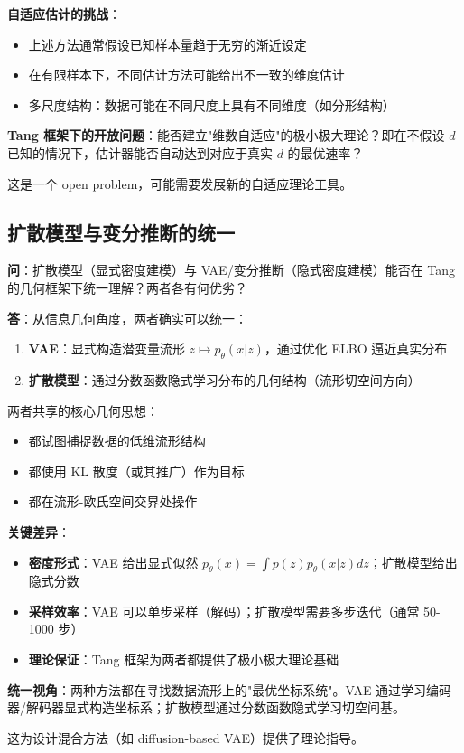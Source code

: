 \textbf{自适应估计的挑战}：
\begin{itemize}
    \item 上述方法通常假设已知样本量趋于无穷的渐近设定
    \item 在有限样本下，不同估计方法可能给出不一致的维度估计
    \item 多尺度结构：数据可能在不同尺度上具有不同维度（如分形结构）
\end{itemize}

\textbf{Tang 框架下的开放问题}：能否建立"维数自适应"的极小极大理论？即在不假设 $d$ 已知的情况下，估计器能否自动达到对应于真实 $d$ 的最优速率？

这是一个 open problem，可能需要发展新的自适应理论工具。

\subsection{扩散模型与变分推断的统一}\label{sec:qa-diffusion-variational}

\textbf{问}：扩散模型（显式密度建模）与 VAE/变分推断（隐式密度建模）能否在 Tang 的几何框架下统一理解？两者各有何优劣？

\textbf{答}：从信息几何角度，两者确实可以统一：

\begin{enumerate}
    \item \textbf{VAE}：显式构造潜变量流形 $z \mapsto p_\theta(x|z)$，通过优化 ELBO 逼近真实分布
    \item \textbf{扩散模型}：通过分数函数隐式学习分布的几何结构（流形切空间方向）
\end{enumerate}

两者共享的核心几何思想：
\begin{itemize}
    \item 都试图捕捉数据的低维流形结构
    \item 都使用 KL 散度（或其推广）作为目标
    \item 都在流形-欧氏空间交界处操作
\end{itemize}

\textbf{关键差异}：
\begin{itemize}
    \item \textbf{密度形式}：VAE 给出显式似然 $p_\theta(x) = \int p(z) p_\theta(x|z) dz$；扩散模型给出隐式分数
    \item \textbf{采样效率}：VAE 可以单步采样（解码）；扩散模型需要多步迭代（通常 50-1000 步）
    \item \textbf{理论保证}：Tang 框架为两者都提供了极小极大理论基础
\end{itemize}

\textbf{统一视角}：两种方法都在寻找数据流形上的"最优坐标系统"。VAE 通过学习编码器/解码器显式构造坐标系；扩散模型通过分数函数隐式学习切空间基。

这为设计混合方法（如 diffusion-based VAE）提供了理论指导。

